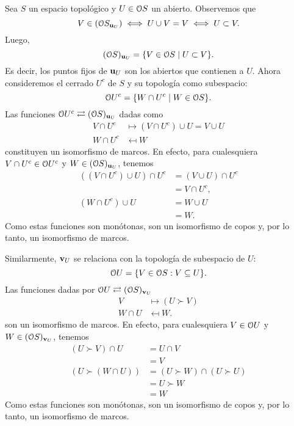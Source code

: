 \begin{example}%
    \label{exe:cociente-abierto-cerrado}
    Sea $S$ un espacio topológico y $U\in\cal OS$ un abierto.
    Observemos que
    \[
        V \in(\cal OS_{\unuc U}) \iff U\cup V=V \iff U\subset V
    .\]
    Luego,
    \[
        (\cal OS)_{\unuc U} = \{V\in \cal OS \mid U\subset V\}
    .\]
    Es decir, los puntos fijos de $\unuc U$ son los abiertos
    que contienen a $U$.
    Ahora consideremos el cerrado $U^c$ de $S$ y su topología
    como subespacio:
    \[
      \cal OU^c = \{W\cap U^c \mid W\in\cal OS\}
    .\]
    Las funciones
    $\cal OU^c\rightleftarrows(\cal OS)_{\unuc U}$
    dadas como
    \begin{align*}
      V\cap U^c &\mapsto (V\cap U^c)\cup U = V\cup U \\
      W\cap U^c &\mapsfrom W
    \end{align*}
    constituyen un isomorfismo de marcos.
    En efecto, para cualesquiera $V\cap U^c\in\cal OU^c$ y
    $W\in(\cal OS)_{\unuc U}$, tenemos
    \begin{align*}
      ((V\cap U^c)\cup U)\cap U^c
      &= (V\cup U)\cap U^c \\
      &= V\cap U^c, \\
      (W\cap U^c)\cup U
      &= W\cup U \\
      &= W.
    \end{align*}
    Como estas funciones son monótonas, son un isomorfismo de
    copos y, por lo tanto, un isomorfismo de marcos.

    Similarmente, $\vnuc U$ se relaciona con la topología de
    subespacio de $U$:
    \[
      \cal OU
      =
      \{V\in \cal OS : V\subseteq U\}
    .\]
    Las funciones dadas por
    $\cal OU\rightleftarrows(\cal OS)_{\vnuc U}$
    \begin{align*}
         V &\mapsto (U\succ V) \\
         W\cap U &\mapsfrom W.
    \end{align*}
    son un isomorfismo de marcos.
    En efecto, para cualesquiera $V\in \cal OU$
    y $W\in (\cal OS)_{\vnuc U}$, tenemos
    \begin{align*}
        (U\succ V)\cap U
        &= U\cap V \\
        &= V \\
        (U\succ (W\cap U))
        &= (U\succ W)\cap(U\succ U) \\
        &= U\succ W \\
        &= W
    \end{align*}
    Como estas funciones son monótonas,
    son un isomorfismo de copos y, por lo tanto,
    un isomorfismo de marcos.
\end{example}

